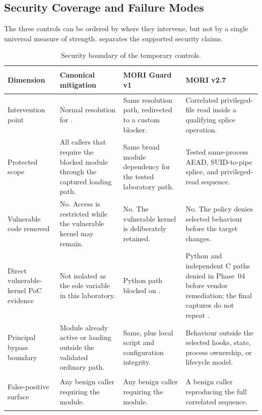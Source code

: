 \subsection{Security Coverage and Failure Modes}

The three controls can be ordered by where they intervene, but not by a single
universal measure of strength.  separates
the supported security claims.

\begin{table}[H]
    \centering
    \caption{Security boundary of the temporary controls.}
    \label{tab:vendor-security-comparison}
    \scriptsize
    \begin{tabularx}{\textwidth}{@{}>{\bfseries\raggedright\arraybackslash}p{}>{\raggedright\arraybackslash}p{}>{\raggedright\arraybackslash}p{}Y@{}}
        \toprule
        Dimension & Canonical  mitigation & MORI Guard v1 & MORI v2.7 \\
        \midrule
        Intervention point &
        Normal  resolution for . &
        Same resolution path, redirected to a custom blocker. &
        Correlated privileged-file read inside a qualifying splice operation. \\

        Protected scope &
        All callers that require the blocked module through the captured loading
        path. &
        Same broad module dependency for the tested laboratory path. &
        Tested same-process AEAD, SUID-to-pipe splice, and privileged-read
        sequence. \\

        Vulnerable code removed &
        No. Access is restricted while the vulnerable kernel may remain. &
        No. The vulnerable kernel is deliberately retained. &
        No. The policy denies selected behaviour before the target changes. \\

        Direct vulnerable-kernel PoC evidence &
        Not isolated as the sole variable in this laboratory. &
        Python path blocked on . &
        Python and independent C paths denied in Phase~04 before vendor
        remediation; the final captures do not repeat . \\

        Principal bypass boundary &
        Module already active or loading outside the validated ordinary path. &
        Same, plus local script and configuration integrity. &
        Behaviour outside the selected hooks, state, process ownership, or
        lifecycle model. \\

        False-positive surface &
        Any benign caller requiring the module. &
        Any benign caller requiring the module. &
        A benign caller reproducing the full correlated sequence. \\
        \bottomrule
    \end{tabularx}
\end{table}

